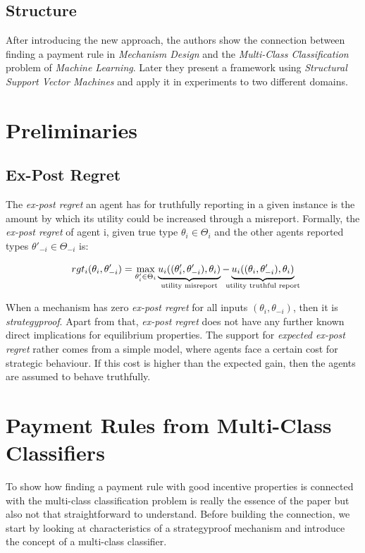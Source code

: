 \documentclass[]{article}
\begin{document}
\subsection{Structure}
After introducing the new approach, the authors show the connection between finding a payment rule in \emph{Mechanism Design} and the \emph{Multi-Class Classification} problem of \emph{Machine Learning}. Later they present a framework using \emph{Structural Support Vector Machines} and apply it in experiments to two different domains. 

\section{Preliminaries}
\subsection{Ex-Post Regret}
The \emph{ex-post regret} an agent has for truthfully reporting in a given instance is the amount by which its utility could be increased through a misreport. Formally, the \emph{ex-post regret} of agent i, given true type $\theta_{i} \in \Theta_{i}$ and the other agents reported types $\theta'_{-i} \in \Theta_{-i}$ is:

\begin{equation*}
rgt_{i}(\theta_{i},\theta'_{-i}) = \max\limits_{\theta'_{i} \in \Theta_{i}} 
\underbrace{u_{i}((\theta'_{i}, \theta'_{-i}), \theta_{i})}_{\mathclap{\text{utility misreport}}}
- \underbrace{u_{i}((\theta_{i}, \theta'_{-i}), \theta_{i})}_{\mathclap{\text{utility truthful report}}}
\end{equation*}

\noindent When a mechanism has zero \emph{ex-post regret} for all inputs $(\theta_{i}, \theta_{-i})$, then it is \emph{strategyproof}. Apart from that, \emph{ex-post regret} does not have any further known direct implications for equilibrium properties. The support for \emph{expected ex-post regret} rather comes from a simple model, where agents face a certain cost for strategic behaviour. If this cost is higher than the expected gain, then the agents are assumed to behave truthfully.


\section{Payment Rules from Multi-Class Classifiers}

To show how finding a payment rule with good incentive properties is connected with the multi-class classification problem is really the essence of the paper but also not that straightforward to understand. Before building the connection, we start by looking at characteristics of a strategyproof mechanism and introduce the concept of a multi-class classifier.
\end{document}
